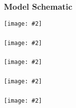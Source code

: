 \documentclass{beamer}
\newcommand{\plotslide}[2]{
  \begin{frame}
    \frametitle{#1}
    \texttt{[image: \#2]}
  \end{frame}
}
\begin{document}
\plotslide{Model Schematic}{../tikz/flow.pdf}

\plotslide{}{StotVsMAPKpp.pdf}

\plotslide{}{SmemVsp3.pdf}

\plotslide{}{ScaffoldVsMAPKppMI.pdf}

\plotslide{}{GradientVsMI.pdf}
\end{document}
